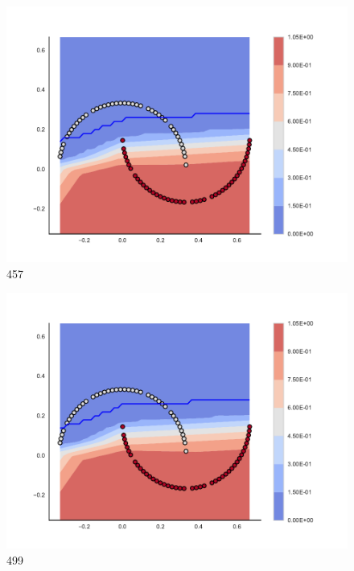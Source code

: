 \begin{subfigure}[b]{0.09\textwidth}
    \includegraphics[clip, trim=2.35cm 1.75cm 4.5cm 0cm,width=\textwidth]{img/convergence/457.pdf}
    \caption{457}
    \label{fig:convergence_457}
\end{subfigure}
%
\begin{subfigure}[b]{0.09\textwidth}
    \includegraphics[clip, trim=2.35cm 1.75cm 4.5cm 0cm,width=\textwidth]{img/convergence/499.pdf}
    \caption{499}
    \label{fig:convergence_499}
\end{subfigure}
%
